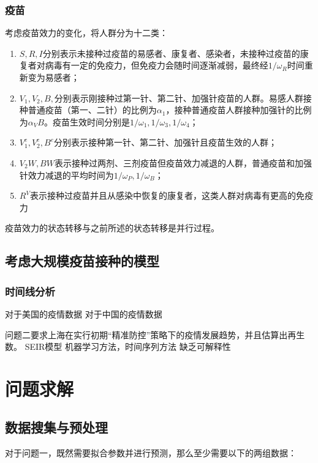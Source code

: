 \documentclass[bwprint]{gmcmthesis}
\numberwithin{figure}{section}
\begin{document}
\subsubsection{疫苗}
\par 考虑疫苗效力的变化，将人群分为十二类：
\begin{enumerate}
\item $S,R,I$分别表示未接种过疫苗的易感者、康复者、感染者，未接种过疫苗的康复者对病毒有一定的免疫力，但免疫力会随时间逐渐减弱，最终经$1/\omega_R$时间重新变为易感者；
\item $V_1,V_2,B,$分别表示刚接种过第一针、第二针、加强针疫苗的人群。易感人群接种普通疫苗（第一、二针）的比例为$\alpha _{1}$，接种普通疫苗人群接种加强针的比例为$\alpha_VB$。疫苗生效时间分别是$1/\omega_1,1/\omega_3,1/\omega_4$；
\item $V_1^e,V_2^e,B^e$分别表示接种第一针、第二针、加强针且疫苗生效的人群；
\item $V_2W,BW$表示接种过两剂、三剂疫苗但疫苗效力减退的人群，普通疫苗和加强针效力减退的平均时间为$1/\omega_P,1/\omega_B$；
\item $R^V$表示接种过疫苗并且从感染中恢复的康复者，这类人群对病毒有更高的免疫力
\end{enumerate}
\par 疫苗效力的状态转移与之前所述的状态转移是并行过程。

\subsection{考虑大规模疫苗接种的模型}
\subsubsection{时间线分析}

对于美国的疫情数据
对于中国的疫情数据



问题二要求上海在实行初期“精准防控”策略下的疫情发展趋势，并且估算出再生数。
SEIR模型
机器学习方法，时间序列方法
缺乏可解释性

\section{问题求解}
\subsection{数据搜集与预处理}
\par 对于问题一，既然需要拟合参数并进行预测，那么至少需要以下的两组数据：
\end{document}

